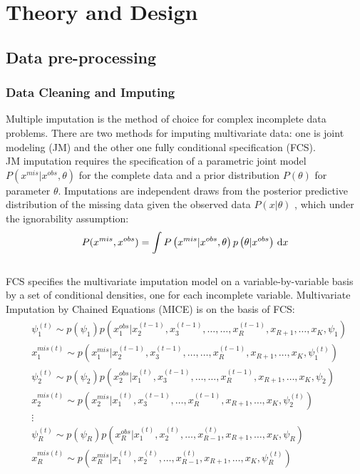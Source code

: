     \section{Theory and Design}
    \subsection{Data pre-processing}
	\subsubsection{Data Cleaning and Imputing}
	\noindent Multiple imputation\citep{DB1987multiple} is the method of choice for complex incomplete data problems. There are two methods for imputing multivariate data: one is joint modeling (JM) and the other one fully conditional specification (FCS)\citep{stef2007multiple}. \\
	[\baselineskip]\indent JM imputation\citep{JL1997analysis} requires the specification of a parametric joint model 
	$P\left({x}^{mis}|{x}^{obs},\theta\right)$ for the complete data and a prior distribution $P(\theta)$  for parameter  $\theta$. Imputations are independent draws from the posterior predictive distribution of the missing data given the observed data $P \left(x|\theta\right)$ , which under the ignorability assumption: \\
	\begin{equation}\label{}
		P({x}^{mis},{x}^{obs})=
		\int P\left({x}^{mis}|{x}^{obs},\theta\right)p\left(\theta| {x}^{obs}\right)\, \mathrm{d}x\\
	\end{equation}
	\\
	[\baselineskip]\indent FCS \citep{stef2015mice} specifies the multivariate imputation model on a variable-by-variable basis by a set of conditional densities, one for each incomplete variable. Multivariate Imputation by Chained Equations (MICE) is on the basis of FCS:\\
	\begin{eqnarray}\label{}
		\begin{split}
			&\psi_1^{(t)}\sim p(\psi_1)p\left( x_1^{obs}|x_2^{(t-1)},x_3^{(t-1)},\dots,\dots,x_{R}^{(t-1)}, x_{R+1},\dots, x_K, \psi_1\right)\\
			&x_1^{mis(t)}\sim p\left(x_1^{mis}|x_2^{(t-1)},x_3^{(t-1)},\dots,\dots,x_{R}^{(t-1)}, x_{R+1},\dots, x_K, \psi_1^{(t)}\right)\\
			&\psi_2^{(t)}\sim p(\psi_2)p\left( x_2^{obs}|x_1^{(t)},x_3^{(t-1)},\dots,\dots,x_{R}^{(t-1)}, x_{R+1},\dots, x_K, \psi_2\right)\\
			&x_2^{mis(t)}\sim p\left(x_2^{mis}|x_1^{(t)},x_3^{(t-1)},\dots,x_R^{(t-1)},x_{R+1},\dots, x_K, \psi_2^{(t)}\right)\\
			& \vdots\\
			&\psi_R^{(t)}\sim p(\psi_R)p\left( x_R^{obs}|x_1^{(t)},x_2^{(t)},\dots,x_{R-1}^{(t)}, x_{R+1},\dots, x_K, \psi_R\right)\\
			&x_R^{mis(t)}\sim p\left(x_ R^{mis}|x_1^{(t)},x_2^{(t)},\dots,x_{R-1}^{(t)}, x_{R+1},\dots, x_K, \psi_ R^{(t)}\right)
		\end{split}
	\end{eqnarray}
	\\

